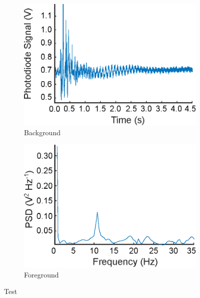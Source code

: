 \documentclass{physics_article_B}
\begin{document}
\begin{figure}[H]
\centering
\begin{subfigure}[b]{0.48\textwidth}                \hspace*{-1cm}\includegraphics[width=\textwidth]{Figures/WaterSignal.eps}
\caption{Background}
\label{fig:Water}
\end{subfigure}\hspace{3pt}
\begin{subfigure}[b]{0.48\textwidth} \hspace*{-0.5cm}\includegraphics[width=\textwidth]{Figures/WaterSignalPD.eps}
\caption{Foreground}
\label{fig:detector:test}
\end{subfigure}
\caption{Test}\label{fig:test}
\end{figure}
    
\end{document}
